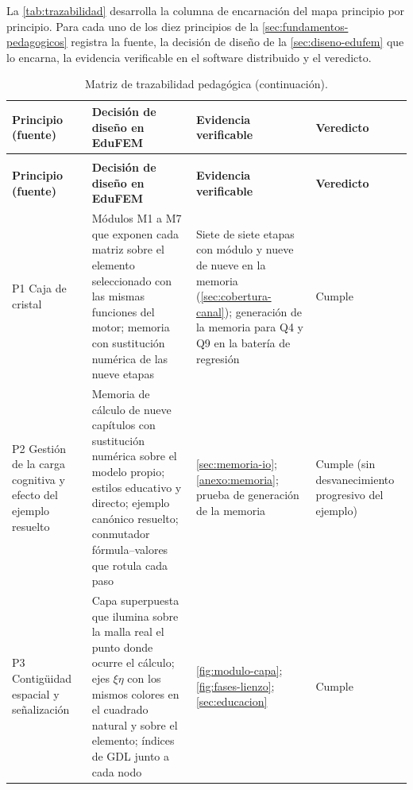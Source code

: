 La \autoref{tab:trazabilidad} desarrolla la columna de encarnación del mapa principio por principio. Para cada uno de los diez principios de la \autoref{sec:fundamentos-pedagogicos} registra la fuente, la decisión de diseño de la \autoref{sec:diseno-edufem} que lo encarna, la evidencia verificable en el software distribuido y el veredicto.

{\footnotesize
\setlength{\tabcolsep}{3pt}
\renewcommand{\arraystretch}{1.15}
\begin{longtable}{@{}>{\raggedright\arraybackslash}p{3.3cm}>{\raggedright\arraybackslash}p{4.7cm}>{\raggedright\arraybackslash}p{4.7cm}>{\raggedright\arraybackslash}p{2.0cm}@{}}
\caption[Matriz de trazabilidad pedagógica: principio, decisión de diseño, evidencia y veredicto.]{Matriz de trazabilidad pedagógica: para cada principio de aprendizaje de la \autoref{sec:fundamentos-pedagogicos}, la decisión de diseño que lo encarna, la evidencia verificable en el software distribuido y el veredicto.}\label{tab:trazabilidad}\\
\toprule
\textbf{Principio (fuente)} & \textbf{Decisión de diseño en EduFEM} & \textbf{Evidencia verificable} & \textbf{Veredicto} \\
\midrule
\endfirsthead
\caption[]{Matriz de trazabilidad pedagógica (continuación).}\\
\toprule
\textbf{Principio (fuente)} & \textbf{Decisión de diseño en EduFEM} & \textbf{Evidencia verificable} & \textbf{Veredicto} \\
\midrule
\endhead
\bottomrule
\endfoot
P1 Caja de cristal \autocite{duboulay1981blackbox} & Módulos M1 a M7 que exponen cada matriz sobre el elemento seleccionado con las mismas funciones del motor; memoria con sustitución numérica de las nueve etapas & Siete de siete etapas con módulo y nueve de nueve en la memoria (\autoref{sec:cobertura-canal}); generación de la memoria para Q4 y Q9 en la batería de regresión & Cumple \\
P2 Gestión de la carga cognitiva y efecto del ejemplo resuelto \autocite{sweller2019cognitive,atkinson2000learning} & Memoria de cálculo de nueve capítulos con sustitución numérica sobre el modelo propio; estilos educativo y directo; ejemplo canónico resuelto; conmutador fórmula--valores que rotula cada paso & \autoref{sec:memoria-io}; \autoref{anexo:memoria}; prueba de generación de la memoria & Cumple (sin desvanecimiento progresivo del ejemplo) \\
P3 Contigüidad espacial y señalización \autocite{mayer2009multimedia} & Capa superpuesta que ilumina sobre la malla real el punto donde ocurre el cálculo; ejes $\xi\eta$ con los mismos colores en el cuadrado natural y sobre el elemento; índices de GDL junto a cada nodo & \autoref{fig:modulo-capa}; \autoref{fig:fases-lienzo}; \autoref{sec:educacion} & Cumple \\

\end{longtable}}
